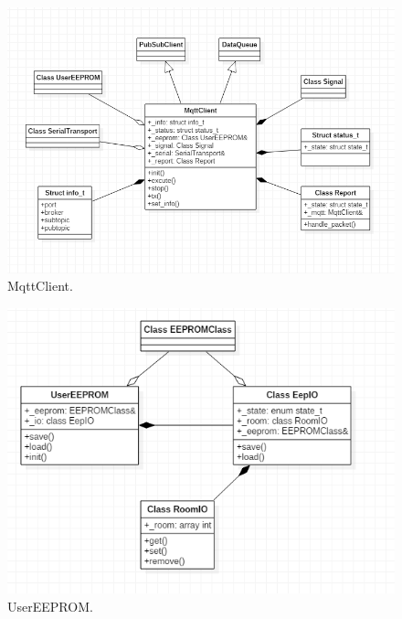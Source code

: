 \documentclass[a4paper,12pt,oneside]{article}
\begin{document}
\begin{itemize}
\begin{itemize}
\begin{figure}[H]
\centering
\begin{center}
\includegraphics[scale=.85]{hinh/class_mqttclient.PNG}
\end{center}
\caption{MqttClient.}
\end{figure}

\begin{figure}[H]
\centering
\begin{center}
\includegraphics[scale=.85]{hinh/class_usereeprom.PNG}
\end{center}
\caption{UserEEPROM.}
\end{figure}


\end{itemize}
\end{itemize}
\end{document}
